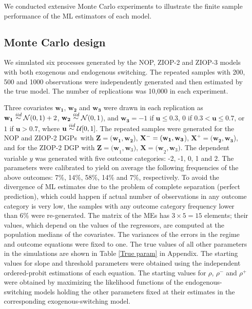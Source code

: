 \documentclass[letterpaper,fleqn,12pt]{article}
\begin{document}
\begin{onehalfspace}
We conducted extensive Monte Carlo experiments to illustrate the finite
sample performance of the ML estimators of each model.

\subsection*{Monte Carlo design}

We simulated six processes generated by the NOP, ZIOP-2 and ZIOP-3 models
with both exogenous and endogenous switching. The repeated samples with 200,
500 and 1000 observations were independently generated and then estimated by
the true model. The number of replications was 10,000 in each experiment.

Three covariates $\mathbf{w}_{\mathbf{1}}$, $\mathbf{w}_{\mathbf{2}}$ and $%
\mathbf{w}_{\mathbf{3}}$ were drawn in each replication as\noindent\ $%
\mathbf{w}_{\mathbf{1}}\overset{\emph{iid}}{\sim }\mathcal{N}(0,1)+2$, $%
\mathbf{w}_{\mathbf{2}}\overset{\emph{iid}}{\sim }\mathcal{N}(0,1$), and $%
\mathbf{w}_{\mathbf{3}}=-1$ if $\mathbf{u}\leq 0.3$, $0$ if $0.3<\mathbf{u}%
\leq 0.7$, or $1$ if $\mathbf{u}>0.7$, where $\mathbf{u}\overset{\emph{iid}}{%
\sim }\mathcal{U}[0,1]$. The repeated samples were generated for the NOP and
ZIOP-2 DGPs\textit{\ }with $\mathbf{Z=(w_{1}},\mathbf{w_{2}}$), $\mathbf{%
\mathbf{X}^{-}=(w_{1}},\mathbf{w_{3}}$), $\mathbf{\mathbf{X}^{+}=(w_{2}},%
\mathbf{w_{3}}$), and for the ZIOP-2 DGP with $\mathbf{Z=(w}_{1},\mathbf{w}%
_{3})$, $\mathbf{\mathbf{X}=(w}_{2},\mathbf{w}_{3})$. The dependent variable 
$y$ was generated with five outcome categories: -2, -1, 0, 1 and 2. The
parameters were calibrated to yield on average the following frequencies of
the above outcomes: 7\%, 14\%, 58\%, 14\% and 7\%, respectively. To avoid
the divergence of ML estimates due to the problem of complete separation
(perfect prediction), which could happen if actual number of observations in
any outcome category is very low, the samples with any outcome category
frequency lower than 6\% were re-generated. The matrix of the MEs has $%
3\times 5=15$ elements; their values, which depend on the values of the
regressors, are computed at the population medians of the covariates. The
variances of the errors in the regime and outcome equations were fixed to
one. The true values of all other parameters in the simulations are shown in
Table \ref{True param} in Appendix. The starting values for slope and
threshold parameters were obtained using the independent ordered-probit
estimations of each equation. The starting values for $\rho $, $\rho ^{-}$
and $\rho ^{+}$ were obtained by maximizing the likelihood functions of the
endogenous-switching models holding the other parameters fixed at their
estimates in the corresponding exogenous-switching model.


\end{onehalfspace}
\end{document}
